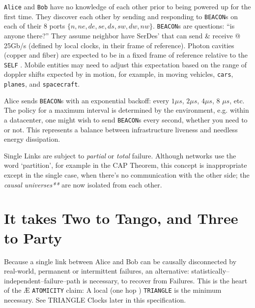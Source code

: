\documentclass[../OAE-SPEC-MAIN.tex]{subfiles}
\begin{document}
\texttt{Alice} and \texttt{Bob} have no knowledge of each other prior to being powered up for the first time. They discover each other by sending and responding to \texttt{BEACON}s on each of their 8 ports $\{n,ne,de,se,ds,sw,dw,nw\}$. \texttt{BEACON}s are questions: ``is anyone there?'' They assume  neighbor \CELLs have SerDes' that can send \& receive @ 25Gb/s (defined by local clocks, in their frame of reference). Photon cavities (copper and fiber) are expected to be in a fixed frame of reference relative to the \texttt{SELF} \CELL.  Mobile entities may need to adjust this expectation based on the range of doppler shifts expected by \CELLs in motion, for example, in moving vehicles, \texttt{cars}, \texttt{planes}, and \texttt{spacecraft}.


Alice sends \texttt{BEACON}s with an exponential backoff: every $1\mu s$, $2 \mu s$, $4 \mu s$, 8 $\mu s$, etc. The  policy for a maximum interval  is determined by the environment, e.g. within a datacenter, one might wish to send  \texttt{BEACON}s every second, whether you need to or not.  This  represents a balance between infrastructure liveness and needless energy dissipation.


Single Links are subject to \emph{partial} or \emph{total} failure. Although networks use the word  `partition', for example in the CAP Theorem\cite{CAP}, this concept is inappropriate except in the single \LINK case, when there's no communication with the other side; the  \emph{causal %
 universes**} are now isolated from each other.
 
 
 
 
 
 
 
 
\section{It takes Two to Tango, and Three to Party}


Because a single link between Alice and Bob can be causally disconnected by real-world, permanent or intermittent failures, an alternative: statistically--independent--failure--path is necessary, to recover from \LINK Failures.  %
This is the heart of the  Æ \texttt{ATOMICITY} claim:   A local (one hop \LINK) \texttt{TRIANGLE}  is the minimum necessary.  See TRIANGLE Clocks later in this specification.
\end{document}
